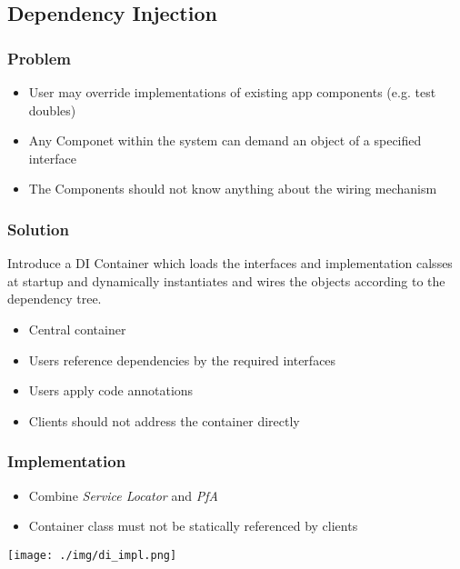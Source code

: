 \subsection{Dependency Injection}
\subsubsection{Problem}
\begin{itemize}
    \item User may override implementations of existing app components (e.g. test doubles)
    \item Any Componet within the system can demand an object of a specified interface
    \item The Components should not know anything about the wiring mechanism
\end{itemize}
\subsubsection{Solution}
Introduce a DI Container which loads the interfaces and implementation calsses at startup and dynamically instantiates and wires the objects according to the dependency tree.
\begin{itemize}
    \item Central container
    \item Users reference dependencies by the required interfaces
    \item Users apply code annotations 
    \item Clients should not address the container directly
\end{itemize}
\subsubsection{Implementation}
\begin{itemize}
    \item Combine \textit{Service Locator} and \textit{PfA}
    \item Container class must not be statically referenced by clients
\end{itemize}
\texttt{[image: ./img/di\_impl.png]}
